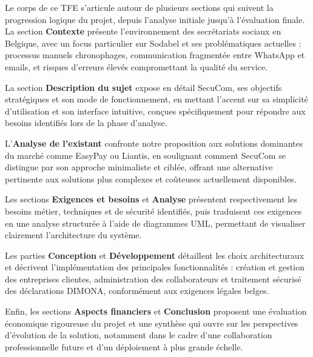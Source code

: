Le corps de ce TFE s'articule autour de plusieurs sections qui suivent la progression logique du projet, depuis l'analyse initiale jusqu'à l'évaluation finale.
\noindent La section \textbf{Contexte} présente l'environnement des secrétariats sociaux en Belgique, avec un focus particulier sur Sodabel et ses problématiques actuelles : processus manuels chronophages, communication fragmentée entre WhatsApp et emails, et risques d'erreurs élevés compromettant la qualité du service.

\noindent La section \textbf{Description du sujet} expose en détail SecuCom, ses objectifs stratégiques et son mode de fonctionnement, en mettant l'accent sur sa simplicité d'utilisation et son interface intuitive, conçues spécifiquement pour répondre aux besoins identifiés lors de la phase d'analyse.

\noindent L'\textbf{Analyse de l'existant} confronte notre proposition aux solutions dominantes du marché comme EasyPay ou Liantis, en soulignant comment SecuCom se distingue par son approche minimaliste et ciblée, offrant une alternative pertinente aux solutions plus complexes et coûteuses actuellement disponibles.

\noindent Les sections \textbf{Exigences et besoins} et \textbf{Analyse} présentent respectivement les besoins métier, techniques et de sécurité identifiés, puis traduisent ces exigences en une analyse structurée à l'aide de diagrammes UML, permettant de visualiser clairement l'architecture du système.

\noindent Les parties \textbf{Conception} et \textbf{Développement} détaillent les choix architecturaux et décrivent l'implémentation des principales fonctionnalités : création et gestion des entreprises clientes, administration des collaborateurs et traitement sécurisé des déclarations DIMONA, conformément aux exigences légales belges.

\noindent Enfin, les sections \textbf{Aspects financiers} et \textbf{Conclusion} proposent une évaluation économique rigoureuse du projet et une synthèse qui ouvre sur les perspectives d'évolution de la solution, notamment dans le cadre d'une collaboration professionnelle future et d'un déploiement à plus grande échelle.
